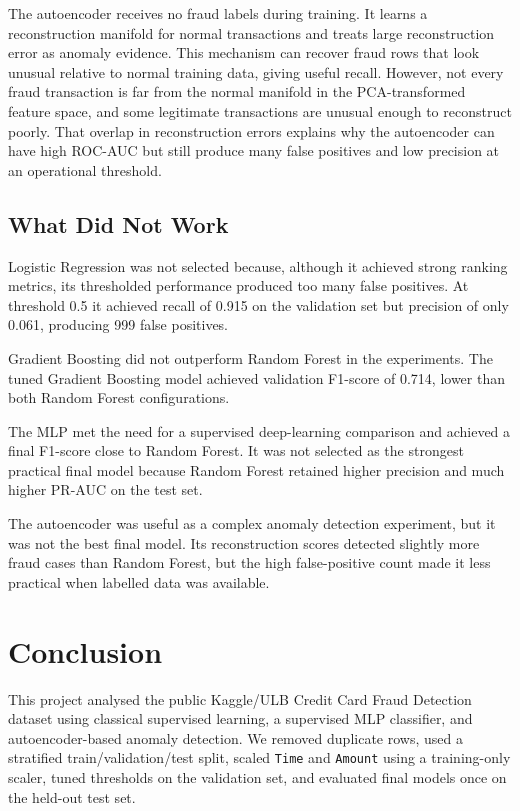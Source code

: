 \documentclass[12pt,a4paper]{report}
\begin{document}
The autoencoder receives no fraud labels during training. It learns a reconstruction manifold for normal transactions and treats large reconstruction error as anomaly evidence. This mechanism can recover fraud rows that look unusual relative to normal training data, giving useful recall. However, not every fraud transaction is far from the normal manifold in the PCA-transformed feature space, and some legitimate transactions are unusual enough to reconstruct poorly. That overlap in reconstruction errors explains why the autoencoder can have high ROC-AUC but still produce many false positives and low precision at an operational threshold.

\section{What Did Not Work}

Logistic Regression was not selected because, although it achieved strong ranking metrics, its thresholded performance produced too many false positives. At threshold 0.5 it achieved recall of 0.915 on the validation set but precision of only 0.061, producing 999 false positives.

Gradient Boosting did not outperform Random Forest in the experiments. The tuned Gradient Boosting model achieved validation F1-score of 0.714, lower than both Random Forest configurations.

The MLP met the need for a supervised deep-learning comparison and achieved a final F1-score close to Random Forest. It was not selected as the strongest practical final model because Random Forest retained higher precision and much higher PR-AUC on the test set.

The autoencoder was useful as a complex anomaly detection experiment, but it was not the best final model. Its reconstruction scores detected slightly more fraud cases than Random Forest, but the high false-positive count made it less practical when labelled data was available.

\chapter{Conclusion}

This project analysed the public Kaggle/ULB Credit Card Fraud Detection dataset using classical supervised learning, a supervised MLP classifier, and autoencoder-based anomaly detection. We removed duplicate rows, used a stratified train/validation/test split, scaled \texttt{Time} and \texttt{Amount} using a training-only scaler, tuned thresholds on the validation set, and evaluated final models once on the held-out test set.
\end{document}
